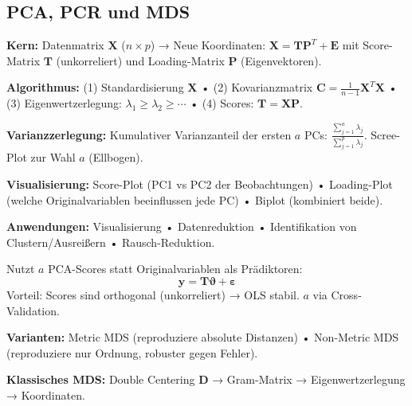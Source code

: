 \newpage

\subsection{PCA, PCR und MDS}


\textbf{Kern:} Datenmatrix $\mathbf{X}$ ($n \times p$) → Neue Koordinaten: $\mathbf{X} = \mathbf{T}\mathbf{P}^T + \mathbf{E}$ mit Score-Matrix $\mathbf{T}$ (unkorreliert) und Loading-Matrix $\mathbf{P}$ (Eigenvektoren).

\textbf{Algorithmus:} (1) Standardisierung $\mathbf{X}$ • (2) Kovarianzmatrix $\mathbf{C} = \frac{1}{n-1}\mathbf{X}^T\mathbf{X}$ • (3) Eigenwertzerlegung: $\lambda_1 \geq \lambda_2 \geq \cdots$ • (4) Scores: $\mathbf{T} = \mathbf{X}\mathbf{P}$.

\textbf{Varianzzerlegung:} Kumulativer Varianzanteil der ersten $a$ PCs: $\frac{\sum_{j=1}^a \lambda_j}{\sum_{j=1}^p \lambda_j}$. Scree-Plot zur Wahl $a$ (Ellbogen).

\textbf{Visualisierung:} Score-Plot (PC1 vs PC2 der Beobachtungen) • Loading-Plot (welche Originalvariablen beeinflussen jede PC) • Biplot (kombiniert beide).

\textbf{Anwendungen:} Visualisierung • Datenreduktion • Identifikation von Clustern/Ausreißern • Rausch-Reduktion.


Nutzt $a$ PCA-Scores statt Originalvariablen als Prädiktoren:
$$\mathbf{y} = \mathbf{T}\boldsymbol{\vartheta} + \boldsymbol{\varepsilon}$$
Vorteil: Scores sind orthogonal (unkorreliert) → OLS stabil. $a$ via Cross-Validation.


\textbf{Varianten:} Metric MDS (reproduziere absolute Distanzen) • Non-Metric MDS (reproduziere nur Ordnung, robuster gegen Fehler).

\textbf{Klassisches MDS:} Double Centering $\mathbf{D}$ → Gram-Matrix → Eigenwertzerlegung → Koordinaten.

